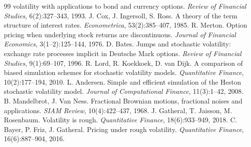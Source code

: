\documentclass[11pt]{article}
\begin{document}
\begin{thebibliography}{99}
  volatility with applications to bond and currency options. \emph{Review of
  Financial Studies}, 6(2):327--343, 1993.
 J. Cox, J. Ingersoll, S. Ross. A theory of the term structure of
  interest rates. \emph{Econometrica}, 53(2):385--407, 1985.
 R. Merton. Option pricing when underlying stock returns are
  discontinuous. \emph{Journal of Financial Economics}, 3(1--2):125--144, 1976.
 D. Bates. Jumps and stochastic volatility: exchange rate
  processes implicit in Deutsche Mark options. \emph{Review of Financial Studies},
  9(1):69--107, 1996.
 R. Lord, R. Koekkoek, D. van Dijk. A comparison
  of biased simulation schemes for stochastic volatility models. \emph{Quantitative
  Finance}, 10(2):177--194, 2010.
 L. Andersen. Simple and efficient simulation of the Heston
  stochastic volatility model. \emph{Journal of Computational Finance},
  11(3):1--42, 2008.
 B. Mandelbrot, J. Van Ness. Fractional Brownian
  motions, fractional noises and applications. \emph{SIAM Review},
  10(4):422--437, 1968.
 J. Gatheral, T. Jaisson, M. Rosenbaum.
  Volatility is rough. \emph{Quantitative Finance}, 18(6):933--949, 2018.
 C. Bayer, P. Friz, J. Gatheral. Pricing under rough
  volatility. \emph{Quantitative Finance}, 16(6):887--904, 2016.
\end{thebibliography}
\end{document}
